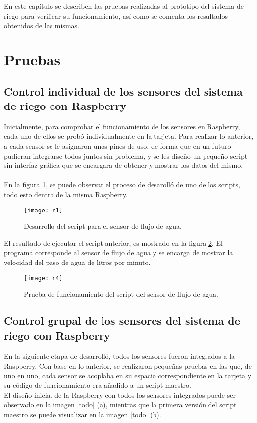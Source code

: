 En este cap\'itulo se describen las pruebas realizadas al prototipo del sistema de riego para verificar su funcionamiento, as\'i como se comenta los resultados obtenidos de las mismas. 

\section{Pruebas}

\subsection{Control individual de los sensores del sistema de riego con Raspberry}
Inicialmente, para comprobar el funcionamiento de los sensores en Raspberry, cada uno de ellos se prob\'o individualmente en la tarjeta. Para realizar lo anterior, a cada sensor se le asignaron unos pines de uso, de forma que en un futuro pudieran integrarse todos juntos sin problema, y se les dise\~{n}o un peque\~{n}o script sin interfaz gr\'afica que se encargara de obtener y mostrar los datos del mismo.\\\\
En la figura \ref{r1}, se puede observar el proceso de desaroll\'o de uno de los scripts, todo esto dentro de la misma Raspberry.
\begin{figure}[H]
\begin{center}
	\texttt{[image: r1]}
\end{center}
	\caption{Desarrollo del script para el sensor de flujo de agua.}
	\label{r1}
\end{figure} 
El resultado de ejecutar el script anterior, es mostrado en la figura \ref{r4}. El programa corresponde al sensor de flujo de agua y se encarga de mostrar la velocidad del paso de agua de litros por minuto.
\begin{figure}[H]
	\begin{center}
		\texttt{[image: r4]}
	\end{center}
	\caption{Prueba de funcionamiento del script del sensor de flujo de agua.}
	\label{r4}
\end{figure} 

\subsection{Control grupal de los sensores del sistema de riego con Raspberry}
En la siguiente etapa de desarroll\'o, todos los sensores fueron integrados a la Raspberry. Con base en lo anterior, se realizaron peque\~{n}as pruebas en las que, de uno en uno, cada sensor se acoplaba en su espacio correspondiente en la tarjeta y su c\'odigo de funcionamiento era a\~{n}adido a un script maestro.\\ 
El dise\~{n}o inicial de la Raspberry con todos los sensores integrados puede ser observado en la imagen \ref{todo} (a), mientras que la primera versi\'on del script maestro se puede visualizar en la imagen \ref{todo} (b). 
 
